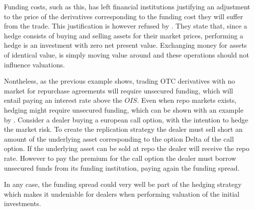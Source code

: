 \documentclass[../main.tex]{subfiles}
\begin{document}
        Funding costs, such as this, has left financial institutions justifying an adjustment to the price of the derivatives corresponding to the funding cost they will suffer from the trade. This justification is however refused by \cite{HullWhite2012FVA}. They state that, since a hedge consists of buying and selling assets for their market prices, performing a hedge is an investment with zero net present value. Exchanging money for assets of identical value, is simply moving value around and these operations should not influence valuations. 

        Nontheless, as the previous example shows, trading OTC derivatives with no market for repurchase agreements will require unsecured funding, which will entail paying an interest rate above the $OIS$. Even when repo markets exists, hedging might require unsecured funding, which can be shown with an example by \cite{Castagna2012FVA}. Consider a dealer buying a european call option, with the intention to hedge the market risk. To create the replication strategy the dealer must sell short an amount of the underlying asset corresponding to the option Delta of the call option. If the underlying asset can be sold at repo the dealer will receive the repo rate. However to pay the premium for the call option the dealer must borrow unsecured funds from its funding institution, paying again the funding spread. 

        In any case, the funding spread could very well be part of the hedging strategy which makes it undeniable for dealers when performing valuation of the initial investments.
        
\end{document}
